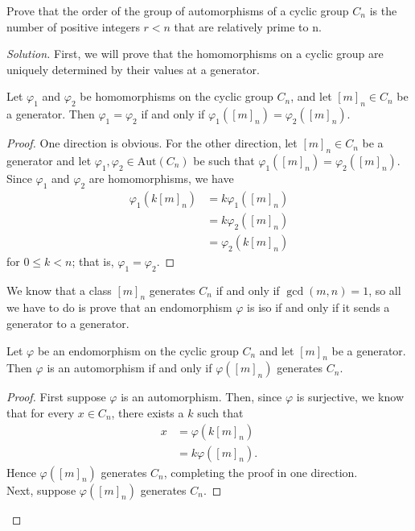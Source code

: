 \documentclass[12pt]{article}
\newenvironment{problem}[2][Problem]{\begin{trivlist}
\item[\hskip \labelsep {\bfseries #1}\hskip \labelsep {\bfseries #2.}]}{\end{trivlist}}
\newenvironment{proposition}[1][Proposition]{\begin{trivlist}
\item[\hskip \labelsep {\bfseries #1.}]}{\end{trivlist}}
\newcommand{\Aut}{\text{Aut}}
\newenvironment{solution}
  {\renewcommand\qedsymbol{$\blacksquare$}\begin{proof}[Solution]}
{\end{proof}}
\newenvironment{sproof}{
  \renewcommand\qedsymbol{$\square$}
  \begin{proof}
  }{
  \end{proof}
}
\begin{document}
\begin{problem}{4.14}
  Prove that the order of the group of automorphisms of a cyclic group $C_n$ is the number of positive
  integers $r<n$ that are relatively prime to n.
\end{problem}
\begin{solution}
  First, we will prove that the homomorphisms on a cyclic group are uniquely determined by their
  values at a generator.
  \begin{proposition}
    Let $\varphi_1$ and $\varphi_2$ be homomorphisms on the cyclic group $C_n$, and let $[m]_n\in C_n$
    be a generator. Then $\varphi_1 = \varphi_2$ if and only if $\varphi_1([m]_n) = \varphi_2([m]_n)$.
  \end{proposition}
  \begin{sproof}
    One direction is obvious. 
    For the other direction, let $[m]_n\in C_n$ be a generator and let 
    $\varphi_1, \varphi_2\in \Aut(C_n)$ be such that
    $\varphi_1([m]_n) = \varphi_2([m]_n)$. 
    Since $\varphi_1$ and $\varphi_2$ are homomorphisms, we have
    \begin{align*}
      \varphi_1(k[m]_n) &= k\varphi_1([m]_n) \\
      &= k\varphi_2([m]_n) \\
      &= \varphi_2(k[m]_n)
    \end{align*}
    for $0\leq k < n$; that is, $\varphi_1=\varphi_2$.
  \end{sproof}
  We know that a class $[m]_n$ generates $C_n$ if and only if $\gcd(m,n)=1$, so all we have to do is prove that
  an endomorphism $\varphi$ is iso if and only if it sends a generator to a generator.
  \begin{proposition}
    Let $\varphi$ be an endomorphism on the cyclic group $C_n$ and let $[m]_n$ be a generator. 
    Then $\varphi$ is an automorphism if and only if $\varphi([m]_n)$ generates $C_n$.
  \end{proposition}
  \begin{sproof}
    First suppose $\varphi$ is an automorphism.
    Then, since $\varphi$ is surjective, we know that for every $x\in C_n$, there exists a $k$ such that
    \begin{align*}
      x &= \varphi(k[m]_n) \\
      &= k\varphi([m]_n).
    \end{align*}
    Hence $\varphi([m]_n)$ generates $C_n$, completing the proof in one direction.\\
    Next, suppose $\varphi([m]_n)$ generates $C_n$. 

\end{sproof}
\end{solution}
\end{document}
